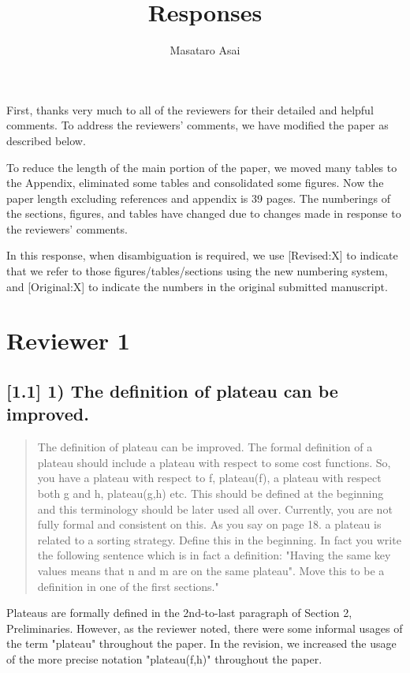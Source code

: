 \documentclass{article}
\author{Masataro Asai}
\date{}
\title{Responses}
\begin{document}
\maketitle
First, thanks very much to all of the reviewers for their detailed and helpful comments.
To address the reviewers' comments, we have modified the paper as described below.

To reduce the length of the main portion of the paper, we moved many tables to the Appendix, 
eliminated some tables and consolidated some figures.
Now the paper length excluding references and appendix is 39 pages.
The numberings of the sections, figures, and tables have changed due to changes made in response to the reviewers' comments.

In this response, when disambiguation is required, we use [Revised:X] to indicate that we refer to those figures/tables/sections using
the new numbering system, and [Original:X] to indicate the numbers in the original submitted manuscript.

\section{Reviewer 1}
\label{sec:orgheadline13}

\subsection{[1.1] 1) The definition of plateau can be improved.}
\label{sec:orgheadline1}

\begin{quote}
The definition of plateau can be improved. The formal definition of
a plateau should include a plateau with respect to some cost
functions. So, you have a plateau with respect to f, plateau(f), a
plateau with respect both g and h, plateau(g,h) etc. This should be
defined at the beginning and this terminology should be later used all
over. Currently, you are not fully formal and consistent on this. As
you say on page 18. a plateau is related to a sorting strategy. Define
this in the beginning. In fact you write the following sentence which
is in fact a definition: "Having the same key values means that n and
m are on the same plateau". Move this to be a definition in one of the
first sections."
\end{quote}

Plateaus are formally defined in the 2nd-to-last paragraph of Section 2, Preliminaries.
However, as the reviewer noted, there were some informal usages of the term "plateau" throughout the paper.
In the revision, we increased the usage of the more precise notation "plateau(f,h)" throughout the paper.
\end{document}
